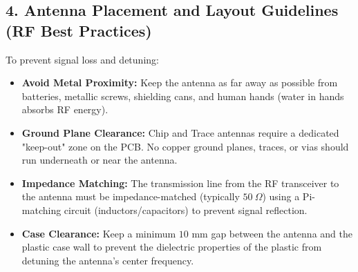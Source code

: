 \subsection{4. Antenna Placement and Layout Guidelines (RF Best Practices)}
To prevent signal loss and detuning:
\begin{itemize}
  \item   \textbf{Avoid Metal Proximity:} Keep the antenna as far away as possible from batteries, metallic screws, shielding cans, and human hands (water in hands absorbs RF energy).
  \item   \textbf{Ground Plane Clearance:} Chip and Trace antennas require a dedicated "keep-out" zone on the PCB. No copper ground planes, traces, or vias should run underneath or near the antenna.
  \item   \textbf{Impedance Matching:} The transmission line from the RF transceiver to the antenna must be impedance-matched (typically $50\ \Omega$) using a Pi-matching circuit (inductors/capacitors) to prevent signal reflection.
  \item   \textbf{Case Clearance:} Keep a minimum $10\text{ mm}$ gap between the antenna and the plastic case wall to prevent the dielectric properties of the plastic from detuning the antenna's center frequency.
\end{itemize}
